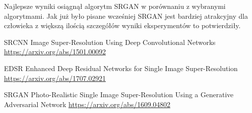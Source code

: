 \documentclass[a4paper,11pt, notitlepage ]{article}
\begin{document}
Najlepsze wyniki osiągnął algorytm SRGAN w porównaniu z wybranymi algorytmami. Jak już było pisane wcześniej SRGAN jest bardziej atrakcyjny dla człowieka z większą ilością szczegółów wyniki eksperymentów to potwierdziły.
\newpage
\begin{thebibliography}{}
	  SRCNN Image Super-Resolution Using Deep Convolutional Networks
	\url{https://arxiv.org/abs/1501.00092}
	
	 EDSR Enhanced Deep Residual Networks for Single Image Super-Resolution \url{https://arxiv.org/abs/1707.02921}
	
	 SRGAN Photo-Realistic Single Image Super-Resolution Using a Generative Adversarial Network \url{https://arxiv.org/abs/1609.04802}
	
\end{thebibliography}
\end{document}
